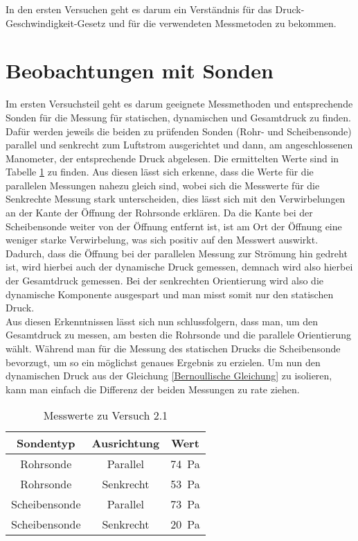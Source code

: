 In den ersten Versuchen geht es darum ein Verständnis für das Druck-Geschwindigkeit-Gesetz und für die verwendeten Messmetoden zu bekommen.

\section{Beobachtungen mit Sonden}

Im ersten Versuchsteil geht es darum geeignete Messmethoden und entsprechende Sonden für die Messung für statischen, dynamischen und Gesamtdruck zu finden. Dafür werden jeweils die beiden zu prüfenden Sonden (Rohr- und Scheibensonde) parallel und senkrecht zum Luftstrom ausgerichtet und dann, am angeschlossenen Manometer, der entsprechende Druck abgelesen. Die ermittelten Werte sind in Tabelle \ref{tab:TabelleD1} zu finden. Aus diesen lässt sich erkenne, dass die Werte für die parallelen Messungen nahezu gleich sind, wobei sich die Messwerte für die Senkrechte Messung stark unterscheiden, dies lässt sich mit den Verwirbelungen an der Kante der Öffnung der Rohrsonde erklären. Da die Kante bei der Scheibensonde weiter von der Öffnung entfernt ist, ist am Ort der Öffnung eine weniger starke Verwirbelung, was sich positiv auf den Messwert auswirkt. Dadurch, dass die Öffnung bei der parallelen Messung zur Strömung hin gedreht ist, wird hierbei auch der dynamische Druck gemessen, demnach wird also hierbei der Gesamtdruck gemessen. Bei der senkrechten Orientierung wird also die dynamische Komponente ausgespart und man misst somit nur den statischen Druck. \\
Aus diesen Erkenntnissen lässt sich nun schlussfolgern, dass man, um den Gesamtdruck zu messen, am besten die Rohrsonde und die parallele Orientierung wählt. Während man für die Messung des statischen Drucks die Scheibensonde bevorzugt, um so ein möglichst genaues Ergebnis zu erzielen. Um nun den dynamischen Druck aus der Gleichung \ref{Bernoullische Gleichung} zu isolieren, kann man einfach die Differenz der beiden Messungen zu rate ziehen.

\begin{table}[]
    \centering
    \caption{Messwerte zu Versuch 2.1}
    \begin{tabular}{c c c}
    	\hline
    	Sondentyp & Ausrichtung & Wert \\
    	\hline
    	Rohrsonde & Parallel &  \SI{74}{\pascal}\\
    	Rohrsonde  & Senkrecht & \SI{53}{\pascal}\\
    	Scheibensonde & Parallel & \SI{73}{\pascal}\\
    	Scheibensonde & Senkrecht &  \SI{20}{\pascal}\\
    	\hline
    \end{tabular}
    \label{tab:TabelleD1}
\end{table}

